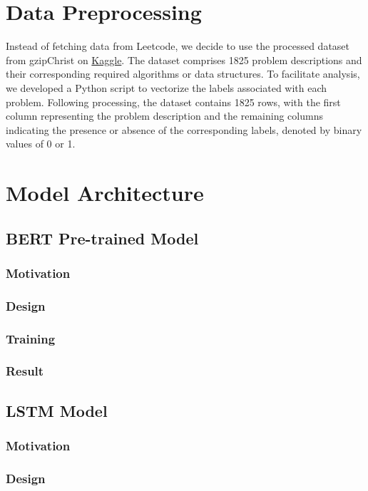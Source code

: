 \documentclass{article}
\begin{document}
\section{Data Preprocessing}
Instead of fetching data from Leetcode, we decide to use the processed dataset from gzipChrist\cite{DATA} on \href{https://www.kaggle.com/}{Kaggle}. The dataset comprises 1825 problem descriptions and their corresponding required algorithms or data structures. To facilitate analysis, we developed a Python script to vectorize the labels associated with each problem. Following processing, the dataset contains 1825 rows, with the first column representing the problem description and the remaining columns indicating the presence or absence of the corresponding labels, denoted by binary values of 0 or 1.
\section{Model Architecture}

\subsection{BERT Pre-trained Model}

\subsubsection{Motivation}
\subsubsection{Design}
\subsubsection{Training}
\subsubsection{Result}

\subsection{LSTM Model}

\subsubsection{Motivation}
\subsubsection{Design}
\end{document}
